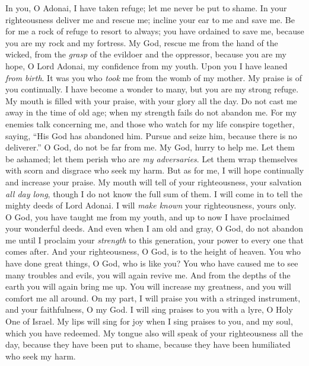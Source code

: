 \begin{biblechapter} %
 In you, O Adonai, I have taken refuge; 
let me never be put to shame.
\verse In your righteousness deliver me and rescue me; 
incline your ear to me and save me.
\verse Be for me a rock of refuge to resort to always; 
you have ordained to save me, 
because you are my rock and my fortress.
\verse My God, rescue me from the hand of the wicked, 
from the \textit{grasp} of the evildoer and the oppressor,
\verse because you are my hope, 
O Lord Adonai, my confidence from my youth.
\verse Upon you I have leaned \textit{from birth}. 
It was you who \textit{took} me from the womb of my mother. 
My praise is of you continually.
\verse I have become a wonder to many, 
but you are my strong refuge.
\verse My mouth is filled with your praise, 
with your glory all the day.
\verse Do not cast me away in the time of old age; 
when my strength fails do not abandon me.
\verse For my enemies talk concerning me, 
and those who watch for my life conspire together,
\verse saying, “His God has abandoned him. 
Pursue and seize him, because there is no deliverer.”
\verse O God, do not be far from me. 
My God, hurry to help me.
\verse Let them be ashamed; let them perish 
who are \textit{my adversaries}. 
Let them wrap themselves with scorn and disgrace 
who seek my harm.
\verse But as for me, I will hope continually 
and increase your praise.
\verse My mouth will tell of your righteousness, 
your salvation \textit{all day long}, 
though I do not know the full sum of them.
\verse I will come in to tell the mighty deeds of Lord Adonai. 
I will \textit{make known} your righteousness, yours only.
\verse O God, you have taught me from my youth, 
and up to now I have proclaimed your wonderful deeds.
\verse And even when I am old and gray, 
O God, do not abandon me 
until I proclaim your \textit{strength} to this generation, 
your power to every one that comes after.
\verse And your righteousness, O God, is to the height of heaven. 
You who have done great things, 
O God, who is like you?
\verse You who have caused me to see many troubles and evils, 
you will again revive me. 
And from the depths of the earth 
you will again bring me up.
\verse You will increase my greatness, 
and you will comfort me all around.
\verse On my part, I will praise you with a stringed instrument, 
and your faithfulness, O my God. 
I will sing praises to you with a lyre, 
O Holy One of Israel.
\verse My lips will sing for joy when I sing praises to you, 
and my soul, which you have redeemed.
\verse My tongue also 
will speak of your righteousness all the day, 
because they have been put to shame, because they have been humiliated 
who seek my harm.
\end{biblechapter}

